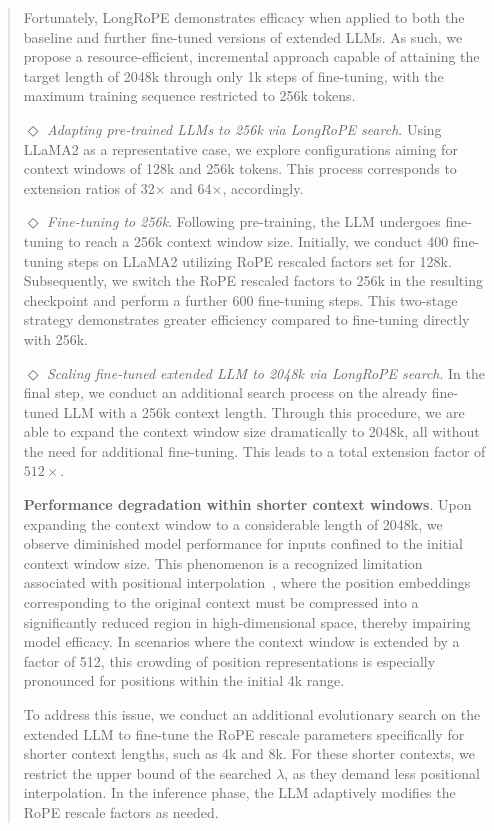 \begin{abstract}
Fortunately, LongRoPE demonstrates efficacy when applied to both the baseline and further fine-tuned versions of extended LLMs. As such, we propose a resource-efficient, incremental approach capable of attaining the target length of 2048k through only 1k steps of fine-tuning, with the maximum training sequence restricted to 256k tokens.

$\Diamond$ \textit{Adapting pre-trained LLMs to 256k via LongRoPE search}. Using LLaMA2 as a representative case, we explore configurations aiming for context windows of 128k and 256k tokens. This process corresponds to extension ratios of 32$\times$ and 64$\times$, accordingly.

$\Diamond$ \textit{Fine-tuning to 256k}. Following pre-training, the LLM undergoes fine-tuning to reach a 256k context window size. Initially, we conduct 400 fine-tuning steps on LLaMA2 utilizing RoPE rescaled factors set for 128k. Subsequently, we switch the RoPE rescaled factors to 256k in the resulting checkpoint and perform a further 600 fine-tuning steps. This two-stage strategy demonstrates greater efficiency compared to fine-tuning directly with 256k.

$\Diamond$ \textit{Scaling fine-tuned extended LLM to 2048k via LongRoPE search}. In the final step, we conduct an additional search process on the already fine-tuned LLM with a 256k context length. Through this procedure, we are able to expand the context window size dramatically to 2048k, all without the need for additional fine-tuning. This leads to a total extension factor of $512\times$.

\textbf{Performance degradation within shorter context windows}. Upon expanding the context window to a considerable length of 2048k, we observe diminished model performance for inputs confined to the initial context window size. This phenomenon is a recognized limitation associated with positional interpolation~\cite{pi}, where the position embeddings corresponding to the original context must be compressed into a significantly reduced region in high-dimensional space, thereby impairing model efficacy. In scenarios where the context window is extended by a factor of 512, this crowding of position representations is especially pronounced for positions within the initial 4k range.

To address this issue, we conduct an additional evolutionary search on the extended LLM to fine-tune the RoPE rescale parameters specifically for shorter context lengths, such as 4k and 8k. For these shorter contexts, we restrict the upper bound of the searched $\lambda$, as they demand less positional interpolation. In the inference phase, the LLM adaptively modifies the RoPE rescale factors as needed.


\end{abstract}
